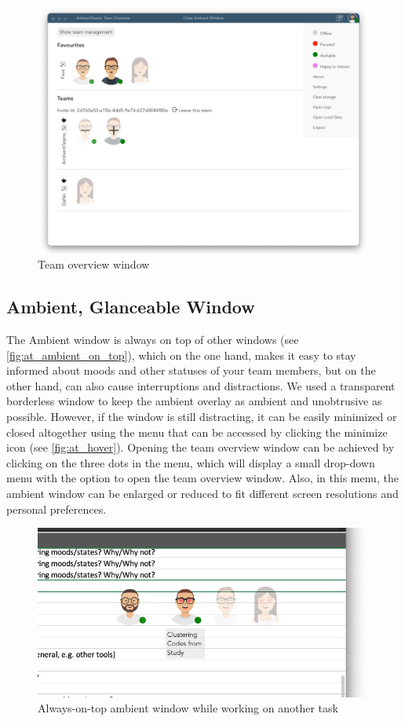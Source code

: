 \begin{figure}[h]
    \centering
    \includegraphics[width=.8\linewidth]{./images/AT_overview.png}
    \caption{Team overview window }
    \label{fig:at_overview}
\end{figure}

\subsection{Ambient, Glanceable Window}
The Ambient window is always on top of other windows (see \autoref{fig:at_ambient_on_top}), which on the one hand, makes it easy to stay informed about moods and other statuses of your team members, but on the other hand, can also cause interruptions and distractions. We used a transparent borderless window to keep the ambient overlay as ambient and unobtrusive as possible. However, if the window is still distracting, it can be easily minimized or closed altogether using the menu that can be accessed by clicking the minimize icon (see \autoref{fig:at_hover}). Opening the team overview window can be achieved by clicking on the three dots in the menu, which will display a small drop-down menu with the option to open the team overview window. Also, in this menu, the ambient window can be enlarged or reduced to fit different screen resolutions and personal preferences.

\begin{figure}[h]
    \centering
    \includegraphics[width=.8\linewidth]{./images/AT_ambient_on_top.png}
    \caption{Always-on-top ambient window while working on another task }
    \label{fig:at_ambient_on_top}
\end{figure}

